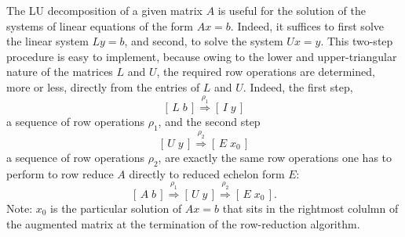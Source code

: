 \documentclass{article}
\begin{document}
The LU decomposition of a given matrix $A$ is useful for the solution
of the  systems of linear equations of the form $Ax = b$.  Indeed, it
suffices to first solve the linear system $Ly=b$, and second, to solve
the system $Ux=y$.  This two-step procedure is easy to implement,
because owing to the lower and upper-triangular nature of  the
matrices $L$ and $U$, the required row operations are determined, more
or less, directly from the entries of $L$ and $U$.  Indeed, the first
step, 
\[ [\, L\; b\, ] \stackrel{\rho_1}{\Longrightarrow}  [\, I \; y \,] \]
a sequence of row operations $\rho_1$, and the second step
\[ [\, U\; y\, ] \stackrel{\rho_2}{\Longrightarrow}  [\, E \; x_0 \,] \]
a sequence of row operations $\rho_2$, are exactly the same row operations 
one has to perform to row reduce $A$ directly to reduced echelon form $E$:
\[ 
[\, A\; b\, ] \stackrel{\rho_1}{\Longrightarrow} [\, U\; y \, ] 
\stackrel{\rho_2}{\Longrightarrow} [\, E\; x_0 \, ] .
\]
Note: $x_0$ is the particular solution of $Ax=b$  that sits in the
rightmost colulmn of the augmented matrix at the termination of the
row-reduction algorithm.
\end{document}
